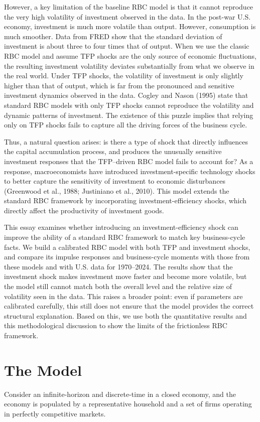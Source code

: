 \documentclass[12pt]{article}
\begin{document}
However, a key limitation of the baseline RBC model is that it cannot reproduce the very high volatility of investment observed in the data. In the post-war U.S. economy,  investment is much more volatile than output. However, consumption is much smoother. Data from FRED show that the standard deviation of investment is about three to four times that of output. When we use the classic RBC model and assume TFP shocks are the only source of economic fluctuations, the resulting investment volatility deviates substantially from what we observe in the real world. Under TFP shocks, the volatility of investment is only slightly higher than that of output, which is far from the pronounced and sensitive investment dynamics observed in the data. Cogley and Nason (1995) state that standard RBC models with only TFP shocks cannot reproduce the volatility and dynamic patterns of investment. The existence of this puzzle implies that relying only on TFP shocks fails to capture all the driving forces of the business cycle.

Thus, a natural question arises: is there a type of shock that directly influences the capital accumulation process, and produces the unusually sensitive investment responses that the TFP–driven RBC model fails to account for?  As a response, macroeconomists have introduced investment-specific technology shocks to better capture the sensitivity of investment to economic disturbances (Greenwood et al., 1988; Justiniano et al., 2010).
This model extends the standard RBC framework by incorporating investment-efficiency shocks, which directly affect the productivity of investment goods.  

This essay examines whether introducing an investment-efficiency shock can improve the ability of a standard RBC framework to match key business-cycle facts. We build a calibrated RBC model with both TFP and investment shocks, and compare its impulse responses and business-cycle moments with those from these models and with U.S. data for 1970–2024.
The results show that the investment shock makes investment move faster and become more volatile, but the model still cannot match both the overall level and the relative size of volatility seen in the data.
This raises a broader point: even if parameters are calibrated carefully, this still does not ensure that the model provides the correct structural explanation. 
Based on this, we use both the quantitative results and this methodological discussion to show the limits of the frictionless RBC framework.

\section{The Model}
Consider an infinite-horizon and discrete-time in a closed economy, and the economy is populated by a representative household and a set of firms operating in perfectly competitive markets.
\end{document}
